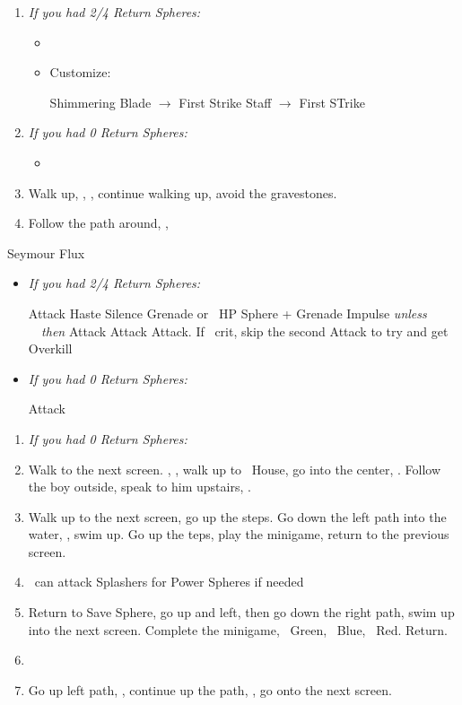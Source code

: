 \begin{enumerate}[resume]
	\item \textit{If you had 2/4 Return Spheres:}
	\begin{itemize}
		\item \formation{\tidus}{\yuna}{\auron} 
		\item Customize:
		\begin{itemize}
			\auronf Shimmering Blade $\rightarrow$ First Strike
			\yunaf Staff $\rightarrow$ First STrike
		\end{itemize}
	\end{itemize}
	\item \textit{If you had 0 Return Spheres:}
	\begin{itemize}
		\item \formation{\tidus}{\kimahri}{\auron}
	\end{itemize}
	\item Walk up, \sd, \cs[1:20], continue walking up, avoid the gravestones.
	\item Follow the path around, \save, \sd
\end{enumerate}
\begin{battle}[70000]{Seymour Flux}
\begin{itemize}
	\item \textit{If you had 2/4 Return Spheres:}
	\begin{itemize}
		\yunaf Attack
		\tidusf Haste \yuna
		\switch{\auron}{\rikku}
		\rikkuf Silence Grenade or \od\ HP Sphere + Grenade
		\summon{\bahamut}
		\bahamutf Impulse \textit{unless \rikku\ \od\ then } Attack
		\yunaf Attack
		\tidusf Attack. If \yuna\ crit, skip the second Attack to try and get Overkill
	\end{itemize}
	\item \textit{If you had 0 Return Spheres:}
	\begin{itemize}
		\switch{\tidus}{\yuna}
		\summon{\bahamut}
		\bahamutf Attack
	\end{itemize}
\end{itemize}
\end{battle}
\begin{enumerate}
	\item \textit{If you had 0 Return Spheres:} \formation{\tidus}{\kimahri}{\auron}
	\item Walk to the next screen. \skippablefmv[0:20], \sd, walk up to \tidus\ House, go into the center, \sd. Follow the boy outside, speak to him upstairs, \sd.
	\item Walk up to the next screen, go up the steps. Go down the left path into the water, \sd, swim up. Go up the teps, play the minigame, return to the previous screen.
	\item \tidus\ can attack Splashers for Power Spheres if needed
	\item Return to Save Sphere, go up and left, then go down the right path, swim up into the next screen. Complete the minigame, \rikku\ Green, \tidus\ Blue, \wakka\ Red. Return.
	\item \formation{\tidus}{\yuna}{\auron}
	\item Go up left path, \sd, continue up the path, \save, go onto the next screen.
\end{enumerate}
